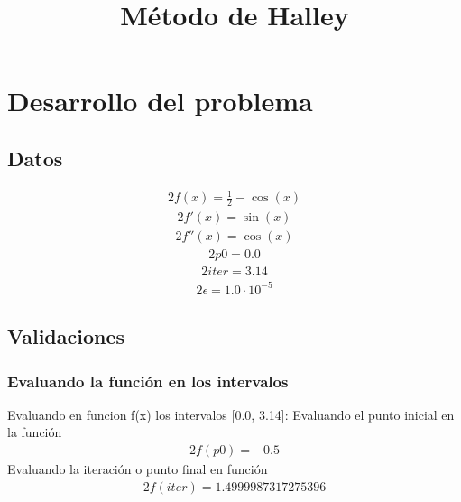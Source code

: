\documentclass{article}%
\title{Método de Halley}%
\begin{document}
%
\normalsize%
\maketitle%
\section{Desarrollo del problema}%
\label{sec:Desarrollodelproblema}%
\subsection{Datos}%
\label{subsec:Datos}%
\begin{alignat*}{2}%
f(x) = \frac{1}{2} - \cos{\left(x \right)}%
\end{alignat*}%
\begin{alignat*}{2}%
f'(x) = \sin{\left(x \right)}%
\end{alignat*}%
\begin{alignat*}{2}%
f''(x) = \cos{\left(x \right)}%
\end{alignat*}%
\begin{alignat*}{2}%
p0 = 0.0%
\end{alignat*}%
\begin{alignat*}{2}%
iter = 3.14%
\end{alignat*}%
\begin{alignat*}{2}%
\epsilon  = 1.0 \cdot 10^{-5}%
\end{alignat*}

%
\subsection{Validaciones}%
\label{subsec:Validaciones}%
\subsubsection{Evaluando la función en los intervalos}%
\label{ssubsec:Evaluandolafuncinenlosintervalos}%
Evaluando en funcion f(x) los intervalos {[}0.0, 3.14{]}: \newline%
%
\newline%
Evaluando el punto inicial en la función\newline%
%
\begin{alignat*}{2}%
f(p0) = -0.5%
\end{alignat*}%
\newline%
Evaluando la iteración o punto final en función\newline%
%
\begin{alignat*}{2}%
f(iter) = 1.4999987317275396%
\end{alignat*}
\end{document}
